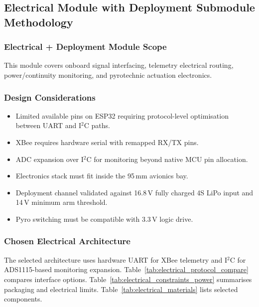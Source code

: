 \subsection{Electrical Module with Deployment Submodule Methodology}

\subsubsection{Electrical + Deployment Module Scope}

This module covers onboard signal interfacing, telemetry electrical routing,
power/continuity monitoring, and pyrotechnic actuation electronics.

\subsubsection{Design Considerations}

\begin{itemize}
  \item Limited available pins on ESP32 requiring protocol-level optimisation
    between UART and I$^2$C paths.
  \item XBee requires hardware serial with remapped RX/TX pins.
  \item ADC expansion over I$^2$C for monitoring beyond native MCU pin allocation.
  \item Electronics stack must fit inside the 95\,mm avionics bay.
  \item Deployment channel validated against 16.8\,V fully charged 4S LiPo input
    and 14\,V minimum arm threshold.
  \item Pyro switching must be compatible with 3.3\,V logic drive.
\end{itemize}

\subsubsection{Chosen Electrical Architecture}

The selected architecture uses hardware UART for XBee telemetry and I$^2$C for
ADS1115-based monitoring expansion. Table~\ref{tab:electrical_protocol_compare}
compares interface options. Table~\ref{tab:electrical_constraints_power} summarises
packaging and electrical limits. Table~\ref{tab:electrical_materials} lists selected
components.

